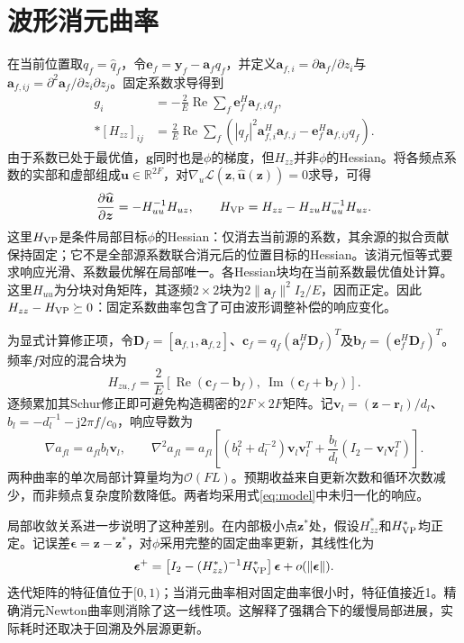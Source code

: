 \documentclass[a4paper,12pt,review]{cas-sc}
\newcommand{\R}{\mathbb R}
\newcommand{\Rea}{\operatorname{Re}}
\begin{document}
\section{波形消元曲率}
在当前位置取$q_f=\widehat q_f$，令$\bm e_f=\bm y_f-\bm a_fq_f$，并定义$\bm a_{f,i}=\partial\bm a_f/\partial z_i$与$\bm a_{f,ij}=\partial^2\bm a_f/\partial z_i\partial z_j$。固定系数求导得到
\begin{align}
 g_i&=-\frac{2}{E}\Rea\sum_f\bm e_f^H\bm a_{f,i}q_f,\label{eq:g}\\*
 [H_{zz}]_{ij}&=\frac{2}{E}\Rea\sum_f
 \left(|q_f|^2\bm a_{f,i}^H\bm a_{f,j}-\bm e_f^H\bm a_{f,ij}q_f\right).
 \label{eq:hfixed}
\end{align}
由于系数已处于最优值，$\bm g$同时也是$\phi$的梯度，但$H_{zz}$并非$\phi$的Hessian。将各频点系数的实部和虚部组成$\bm u\in\R^{2F}$，对$\nabla_u\mathcal L(\bm z,\widehat{\bm u}(\bm z))=0$求导，可得
\begin{equation}
 \frac{\partial\widehat{\bm u}}{\partial\bm z}=-H_{uu}^{-1}H_{uz},\qquad
 H_{\rm VP}=H_{zz}-H_{zu}H_{uu}^{-1}H_{uz}.
 \label{eq:schur}
\end{equation}
这里$H_{\rm VP}$是条件局部目标$\phi$的Hessian：仅消去当前源的系数，其余源的拟合贡献保持固定；它不是全部源系数联合消元后的位置目标的Hessian。该消元恒等式\cite{GolubPereyra1973}要求响应光滑、系数最优解在局部唯一。各Hessian块均在当前系数最优值处计算。这里$H_{uu}$为分块对角矩阵，其逐频$2\times2$块为$2\|\bm a_f\|^2 I_2/E$，因而正定。因此$H_{zz}-H_{\rm VP}\succeq0$：固定系数曲率包含了可由波形调整补偿的响应变化。

为显式计算修正项，令$\bm D_f=[\bm a_{f,1},\bm a_{f,2}]$、$\bm c_f=q_f(\bm a_f^H\bm D_f)^T$及$\bm b_f=(\bm e_f^H\bm D_f)^T$。频率$f$对应的混合块为
\begin{equation}
 H_{zu,f}=\frac{2}{E}
 [\Rea(\bm c_f-\bm b_f),\ \operatorname{Im}(\bm c_f+\bm b_f)].
 \label{eq:cross}
\end{equation}
逐频累加其Schur修正即可避免构造稠密的$2F\times2F$矩阵。记$\bm v_l=(\bm z-\bm r_l)/d_l$、$b_l=-d_l^{-1}-\mathrm j2\pi f/c_0$，响应导数为
\begin{equation}
 \nabla a_{fl}=a_{fl}b_l\bm v_l,\qquad
 \nabla^2a_{fl}=a_{fl}\left[(b_l^2+d_l^{-2})\bm v_l\bm v_l^T
 +\frac{b_l}{d_l}(I_2-\bm v_l\bm v_l^T)\right].
 \label{eq:response}
\end{equation}
两种曲率的单次局部计算量均为$\mathcal O(FL)$。预期收益来自更新次数和循环次数减少，而非频点复杂度阶数降低。两者均采用式\eqref{eq:model}中未归一化的响应。

局部收敛关系进一步说明了这种差别。在内部极小点$\bm z^*$处，假设$H_{zz}^*$和$H_{\rm VP}^*$均正定。记误差$\bm\epsilon=\bm z-\bm z^*$，对$\phi$采用完整的固定曲率更新，其线性化为
\begin{equation}
 \bm\epsilon^+=\left[I_2-(H_{zz}^*)^{-1}H_{\rm VP}^*\right]\bm\epsilon
 +o(\|\bm\epsilon\|).
 \label{eq:rate}
\end{equation}
迭代矩阵的特征值位于$[0,1)$；当消元曲率相对固定曲率很小时，特征值接近1。精确消元Newton曲率则消除了这一线性项。这解释了强耦合下的缓慢局部进展，实际耗时还取决于回溯及外层源更新。
\end{document}
